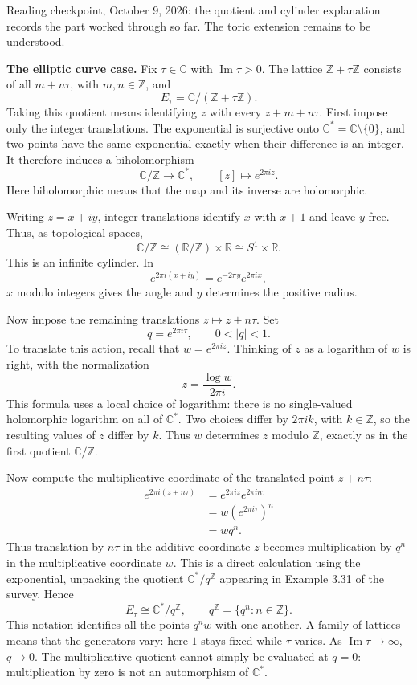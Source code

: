 \medskip\noindent
Reading checkpoint, October 9, 2026:
the quotient and cylinder explanation
records the part worked through so far.
The toric extension remains to be understood.

\medskip\noindent
{\bf The elliptic curve case.}
Fix $\tau\in\mathbb{C}$ with
$\operatorname{Im}\tau>0$. The lattice
$\mathbb{Z}+\tau\mathbb{Z}$ consists of
all $m+n\tau$, with $m,n\in\mathbb{Z}$,
and
$$
E_\tau=\mathbb{C}/
(\mathbb{Z}+\tau\mathbb{Z}).
$$
Taking this quotient means identifying
$z$ with every $z+m+n\tau$.
First impose only the integer translations.
The exponential is surjective onto
$\mathbb{C}^*=\mathbb{C}\setminus\{0\}$,
and two points have the same exponential
exactly when their difference is an integer.
It therefore induces a biholomorphism
$$
\mathbb{C}/\mathbb{Z}
\longrightarrow\mathbb{C}^*,
\qquad [z]\longmapsto e^{2\pi iz}.
$$
Here biholomorphic means that the map and
its inverse are holomorphic.

\medskip\noindent
Writing $z=x+iy$, integer translations
identify $x$ with $x+1$ and leave $y$ free.
Thus, as topological spaces,
$$
\mathbb{C}/\mathbb{Z}
\cong(\mathbb{R}/\mathbb{Z})\times\mathbb{R}
\cong S^1\times\mathbb{R}.
$$
This is an infinite cylinder. In
$$
e^{2\pi i(x+iy)}
=e^{-2\pi y}e^{2\pi ix},
$$
$x$ modulo integers gives the angle and
$y$ determines the positive radius.

\medskip\noindent
Now impose the remaining translations
$z\mapsto z+n\tau$. Set
$$
q=e^{2\pi i\tau},\qquad 0<|q|<1.
$$
To translate this action, recall that
$w=e^{2\pi iz}$. Thinking of $z$ as a
logarithm of $w$ is right, with the
normalization
$$
z=\frac{\log w}{2\pi i}.
$$
This formula uses a local choice of
logarithm: there is no single-valued
holomorphic logarithm on all of
$\mathbb{C}^*$. Two choices differ by
$2\pi i k$, with $k\in\mathbb{Z}$, so
the resulting values of $z$ differ by
$k$. Thus $w$ determines $z$ modulo
$\mathbb{Z}$, exactly as in the first
quotient $\mathbb{C}/\mathbb{Z}$.

Now compute the multiplicative coordinate
of the translated point $z+n\tau$:
$$
\begin{aligned}
e^{2\pi i(z+n\tau)}
&=e^{2\pi iz}e^{2\pi in\tau}\\
&=w(e^{2\pi i\tau})^n\\
&=wq^n.
\end{aligned}
$$
Thus translation by $n\tau$ in the
additive coordinate $z$ becomes
multiplication by $q^n$ in the
multiplicative coordinate $w$.
This is a direct calculation using
the exponential, unpacking the quotient
$\mathbb{C}^*/q^{\mathbb{Z}}$ appearing
in Example 3.31 of the survey.
Hence
$$
E_\tau\cong\mathbb{C}^*/q^{\mathbb{Z}},
\qquad
q^{\mathbb{Z}}=\{q^n:n\in\mathbb{Z}\}.
$$
This notation identifies all the points
$q^nw$ with one another.
A family of lattices means that the
generators vary: here $1$ stays fixed
while $\tau$ varies. As
$\operatorname{Im}\tau\to\infty$, $q\to0$.
The multiplicative quotient cannot simply
be evaluated at $q=0$: multiplication
by zero is not an automorphism of
$\mathbb{C}^*$.


